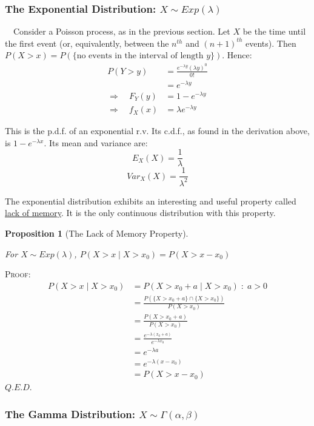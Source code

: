 \documentclass[12pt,a4paper]{article}
\newtheorem{prop}[thm]{Proposition}
\begin{document}
\subsubsection{The Exponential Distribution: $X \sim Exp(\lambda)$}

$\quad$Consider a Poisson process, as in the previous section. Let $X$ be the time until the first event (or, equivalently, between the $n^{th}$ and $(n+1)^{th}$ events). Then\\ $P(X>x) = P(\{\text{no events in the interval of length $y$}\})$. Hence:
\begin{align*}
 P(Y>y) &= \frac{e^{-\lambda y}(\lambda y)^0}{0!}\\
 &= e^{-\lambda y}\\
\Rightarrow \quad F_Y(y) &= 1 - e^{-\lambda y}\\
\Rightarrow\quad f_X(x) &= \lambda e^{-\lambda y}
\end{align*}

This is the p.d.f. of an exponential r.v. Its c.d.f., as found in the derivation above, is $1-e^{-\lambda x}$. Its mean and variance are:
$$E_{X}(X) = \frac{1}{\lambda}$$
$$Var_{X}(X) = \frac{1}{\lambda^2}$$

The exponential distribution exhibits an interesting and useful property called \underline{lack of memory}. It is the only continuous distribution with this property.

\begin{prop}[The Lack of Memory Property]$\quad$\par
\vspace{1cm}

For $X \sim Exp(\lambda)$, $P(X>x\; | \; X>x_0) = P(X>x-x_0)$
\end{prop}

\noindent\textsc{Proof:}
\begin{align*}
P(X>x\; | \; X>x_0) &= P(X > x_0 + a\; | \; X > x_0) \; : \; a>0\\
&= \frac{P(\{X > x_0 + a\}\cap \{X > x_0\})}{P(X > x_0)}\\
&= \frac{P(X > x_0 + a)}{P(X > x_0)}\\
&=\frac{e^{-\lambda (x_0 + a)}}{e^{-\lambda x_0}}\\
&= e^{-\lambda a}\\
&= e^{-\lambda (x-x_0)}\\
&= P(X>x-x_0)
\end{align*}
\hfill$Q.E.D.$

\subsubsection{The Gamma Distribution: $X \sim \Gamma(\alpha,\beta)$}
\end{document}
